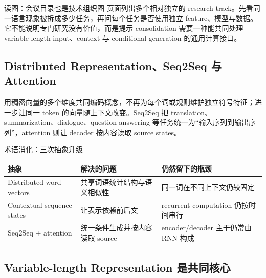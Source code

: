 
\begin{knowledgebox}{读图：会议目录也是技术组织图}
页面列出多个相对独立的 research track。先看同一语言现象被拆成多少任务，再问每个任务是否使用独立 feature、模型与数据。它不能说明专门研究没有价值，而是提示 consolidation 需要一种能共同处理 variable-length input、context 与 conditional generation 的通用计算接口。
\end{knowledgebox}

\subsection{Distributed Representation、Seq2Seq 与 Attention}

用稠密向量的多个维度共同编码概念，不再为每个词或规则维护独立符号特征；进一步让同一 token 的向量随上下文改变。Seq2Seq 把 translation、summarization、dialogue、question answering 等任务统一为“输入序列到输出序列”，attention 则让 decoder 按内容读取 source states。


\begin{knowledgebox}{术语消化：三次抽象升级}
\begin{tabularx}{\textwidth}{@{}L{0.20\textwidth}X X@{}}
\toprule
抽象 & 解决的问题 & 仍然留下的瓶颈 \\
\midrule
Distributed word vectors & 共享词语统计结构与语义相似性 & 同一词在不同上下文仍较固定 \\
Contextual sequence states & 让表示依赖前后文 & recurrent computation 仍按时间串行 \\
Seq2Seq + attention & 统一条件生成并按内容读取 source & encoder/decoder 主干仍常由 RNN 构成 \\
\bottomrule
\end{tabularx}
\end{knowledgebox}


\subsection{Variable-length Representation 是共同核心}

